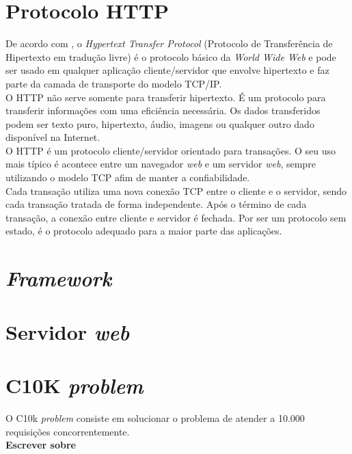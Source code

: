 \section{Protocolo HTTP}
De acordo com , o \textit{Hypertext Transfer Protocol} (Protocolo de Transferência de Hipertexto em tradução livre) é o protocolo básico da \textit{World Wide Web} e pode ser usado em qualquer aplicação cliente/servidor que envolve hipertexto e faz parte da camada de transporte do modelo TCP/IP.\\
O HTTP não serve somente para transferir hipertexto. É um protocolo para transferir informações com uma eficiência necessária. Os dados transferidos podem ser texto puro, hipertexto, áudio, imagens ou qualquer outro dado disponível na Internet.\\
O HTTP é um protocolo cliente/servidor orientado para transações. O seu uso mais típico é acontece entre um navegador \textit{web} e um servidor \textit{web}, sempre utilizando o modelo TCP afim de manter a confiabilidade.\\
Cada transação utiliza uma nova conexão TCP entre o cliente e o servidor, sendo cada transação tratada de forma independente. Após o término de cada transação, a conexão entre cliente e servidor é fechada. Por ser um protocolo sem estado, é o protocolo adequado para a maior parte das aplicações.
\section{\textit{Framework}}
\section{Servidor \textit{web}}
\section{C10K \textit{problem}}
O C10k \textit{problem} consiste em solucionar o problema de atender a 10.000 requisições concorrentemente.\\
\textbf{Escrever sobre}